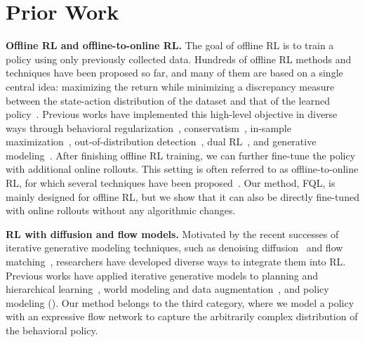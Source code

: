 \section{Prior Work}
\label{sec:related}

\textbf{Offline RL and offline-to-online RL.}
%
The goal of offline RL is to train a policy using only previously collected data.
Hundreds of offline RL methods and techniques have been proposed so far,
and many of them are based on a single central idea:
maximizing the return while minimizing a discrepancy measure between
the state-action distribution of the dataset and that of the learned policy~\citep{offline_levine2020, dualrl_sikchi2024}.
Previous works have implemented this high-level objective in diverse ways through
behavioral regularization~\citep{awac_nair2020, td3bc_fujimoto2021, rebrac_tarasov2023},
conservatism~\citep{cql_kumar2020},
in-sample maximization~\citep{iql_kostrikov2022, sql_xu2023, xql_garg2023},
out-of-distribution detection~\citep{mopo_yu2020, morel_kidambi2020, edac_an2021, sacrnd_nikulin2023},
dual RL~\citep{optidice_lee2021, dualrl_sikchi2024},
and generative modeling~\citep{dt_chen2021, tt_janner2021, diffuser_janner2022}.
After finishing offline RL training, we can further fine-tune the policy with additional online rollouts.
This setting is often referred to as offline-to-online RL,
for which several techniques have been proposed~\citep{o2o_lee2021, hybridrl_song2023, calql_nakamoto2023, rlpd_ball2023, aca_yu2023}.
Our method, FQL, is mainly designed for offline RL,
but we show that it can also be directly fine-tuned with online rollouts without any algorithmic changes.
%
%
%

\textbf{RL with diffusion and flow models.}
Motivated by the recent successes of iterative generative modeling techniques,
such as denoising diffusion~\citep{diffusion_sohl2015, ddpm_ho2020, cg_dhariwal2021}
and flow matching~\citep{flow_lipman2023, sd3_esser2024},
researchers have developed diverse ways to integrate them into RL.
Previous works have applied iterative generative models to
planning and hierarchical learning~\citep{diffuser_janner2022, dd_ajay2023, guidedflow_zheng2023, adaptdiffuser_liang2023, hdmi_li2023, sgp_suh2023, ldcq_venkatraman2024, hd_chen2024},
world modeling and data augmentation~\citep{synther_lu2023, dwm_ding2024, pgd_jackson2024, diamond_alonso2024},
and policy modeling ().
Our method belongs to the third category,
where we model a policy with an expressive flow network
to capture the arbitrarily complex distribution of the behavioral policy.
%
%
%
%
%
%
%
%
%
%
%
%

